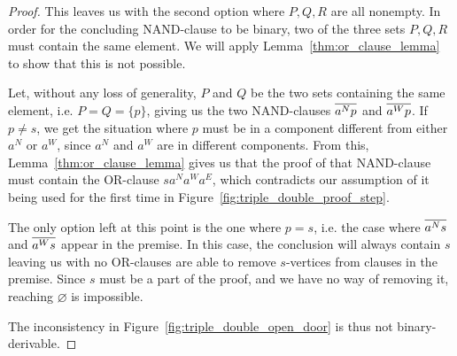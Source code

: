\begin{proof}
This leaves us with the second option where $P,Q,R$ are all nonempty.
In order for the concluding NAND-clause to be binary, two of the three sets $P,Q,R$ must contain the same element.
We will apply Lemma~\ref{thm:or_clause_lemma} to show that this is not possible.

Let, without any loss of generality, $P$ and $Q$ be the two sets containing the same element, i.e. $P = Q = \{p\}$, giving us the two NAND-clauses $\ol{a^Np}$ and $\ol{a^Wp}$.
If $p \neq s$, we get the situation where $p$ must be in a component different from either $a^N$ or $a^W$, since $a^N$ and $a^W$ are in different components.
From this, Lemma~\ref{thm:or_clause_lemma} gives us that the proof of that NAND-clause must contain the OR-clause $sa^Na^Wa^E$, which contradicts our assumption of it being used for the first time in Figure~\ref{fig:triple_double_proof_step}.

The only option left at this point is the one where $p = s$, i.e. the case where $\ol{a^Ns}$ and $\ol{a^Ws}$ appear in the premise.
In this case, the conclusion will always contain $s$ leaving us with no OR-clauses are able to remove $s$-vertices from clauses in the premise.
Since $s$ must be a part of the proof, and we have no way of removing it, reaching $\varnothing$ is impossible.

The inconsistency in Figure~\ref{fig:triple_double_open_door} is thus not binary-derivable.
\end{proof}
